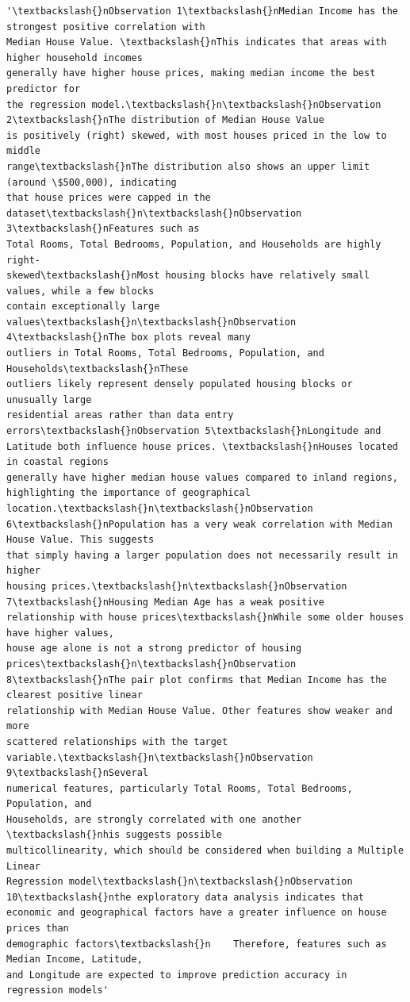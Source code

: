 \documentclass[11pt]{article}
\makeatletter
\newcommand{\boxspacing}{\kern\kvtcb@left@rule\kern\kvtcb@boxsep}
\newcommand{\prompt}[4]{
        {\ttfamily\llap{{\color{#2}[#3]:\hspace{3pt}#4}}\vspace{-\baselineskip}}
    }
\makeatother
\begin{document}
            \begin{tcolorbox}[breakable, size=fbox, boxrule=.5pt, pad at break*=1mm, opacityfill=0]
\prompt{Out}{outcolor}{73}{\boxspacing}
\begin{Verbatim}[commandchars=\\\{\}]
'\textbackslash{}nObservation 1\textbackslash{}nMedian Income has the strongest positive correlation with
Median House Value. \textbackslash{}nThis indicates that areas with higher household incomes
generally have higher house prices, making median income the best predictor for
the regression model.\textbackslash{}n\textbackslash{}nObservation 2\textbackslash{}nThe distribution of Median House Value
is positively (right) skewed, with most houses priced in the low to middle
range\textbackslash{}nThe distribution also shows an upper limit (around \$500,000), indicating
that house prices were capped in the dataset\textbackslash{}n\textbackslash{}nObservation 3\textbackslash{}nFeatures such as
Total Rooms, Total Bedrooms, Population, and Households are highly right-
skewed\textbackslash{}nMost housing blocks have relatively small values, while a few blocks
contain exceptionally large values\textbackslash{}n\textbackslash{}nObservation 4\textbackslash{}nThe box plots reveal many
outliers in Total Rooms, Total Bedrooms, Population, and Households\textbackslash{}nThese
outliers likely represent densely populated housing blocks or unusually large
residential areas rather than data entry errors\textbackslash{}nObservation 5\textbackslash{}nLongitude and
Latitude both influence house prices. \textbackslash{}nHouses located in coastal regions
generally have higher median house values compared to inland regions,
highlighting the importance of geographical location.\textbackslash{}n\textbackslash{}nObservation
6\textbackslash{}nPopulation has a very weak correlation with Median House Value. This suggests
that simply having a larger population does not necessarily result in higher
housing prices.\textbackslash{}n\textbackslash{}nObservation 7\textbackslash{}nHousing Median Age has a weak positive
relationship with house prices\textbackslash{}nWhile some older houses have higher values,
house age alone is not a strong predictor of housing prices\textbackslash{}n\textbackslash{}nObservation
8\textbackslash{}nThe pair plot confirms that Median Income has the clearest positive linear
relationship with Median House Value. Other features show weaker and more
scattered relationships with the target variable.\textbackslash{}n\textbackslash{}nObservation 9\textbackslash{}nSeveral
numerical features, particularly Total Rooms, Total Bedrooms, Population, and
Households, are strongly correlated with one another \textbackslash{}nhis suggests possible
multicollinearity, which should be considered when building a Multiple Linear
Regression model\textbackslash{}n\textbackslash{}nObservation 10\textbackslash{}nthe exploratory data analysis indicates that
economic and geographical factors have a greater influence on house prices than
demographic factors\textbackslash{}n    Therefore, features such as Median Income, Latitude,
and Longitude are expected to improve prediction accuracy in regression models'
\end{Verbatim}
\end{tcolorbox}
        
\end{document}
